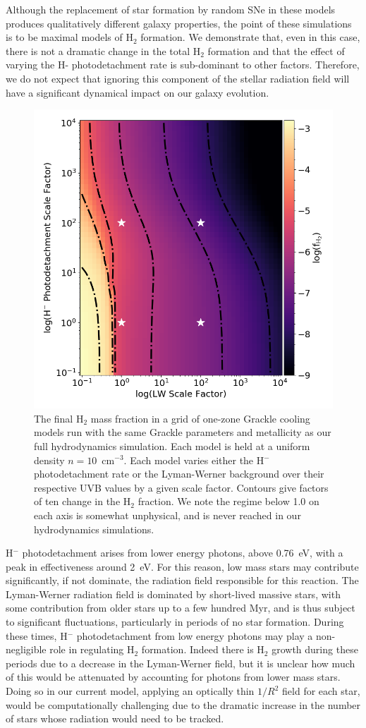 Although the replacement of star formation by random SNe in these models produces qualitatively different galaxy properties, the point of these simulations is to be maximal models of H$_2$ formation. We demonstrate that, even in this case, there is not a dramatic change in the total H$_2$ formation and that the effect of varying the H- photodetachment rate is sub-dominant to other factors. Therefore, we do not expect that ignoring this component of the stellar radiation field will have a significant dynamical impact on our galaxy evolution.

\begin{figure}
\centering
\includegraphics[width=0.75\linewidth]{figures/ch1/fH2.png}
\caption{The final H$_2$ mass fraction in a grid of one-zone Grackle cooling models run with the same Grackle parameters and metallicity as our full hydrodynamics simulation. Each model is held at a uniform density $n = 10$~cm$^{-3}$. Each model varies either the H$^{-}$ photodetachment rate or the Lyman-Werner background over their respective UVB values by a given scale factor. Contours give factors of ten change in the H$_2$ fraction. We note the regime below 1.0 on each axis is somewhat unphysical, and is never reached in our hydrodynamics simulations.}
\label{ch1:fig:Grackle grid}
\end{figure}

H$^-$ photodetachment arises from lower energy photons, above 0.76~eV, with a peak in effectiveness around 2~eV. For this reason, low mass stars may contribute significantly, if not dominate, the radiation field responsible for this reaction. The Lyman-Werner radiation field is dominated by short-lived massive stars, with some contribution from older stars up to a few hundred Myr, and is thus subject to significant fluctuations, particularly in periods of no star formation. During these times, H$^-$ photodetachment from low energy photons may play a non-negligible role in regulating H$_2$ formation. Indeed there is H$_2$ growth during these periods due to a decrease in the Lyman-Werner field, but it is unclear how much of this would be attenuated by accounting for photons from lower mass stars. Doing so in our current model, applying an optically thin $1/R^2$ field for each star, would be computationally challenging due to the dramatic increase in the number of stars whose radiation would need to be tracked.

